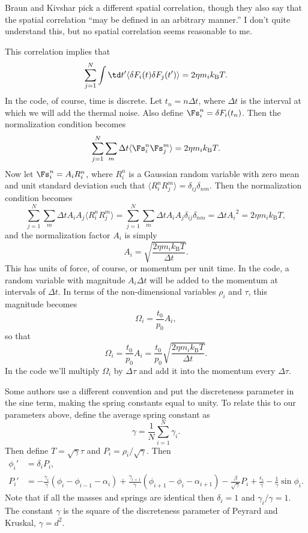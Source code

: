 \documentclass[11pt]{article}
\begin{document}
Braun and Kivshar pick a different spatial correlation, though they also say that the spatial correlation ``may be defined in an arbitrary manner.'' I don't quite understand this, but no spatial correlation seems reasonable to me.

This correlation implies that
\[
\sum_{j=1}^N\int \td t' \langle\delta F_i(t)\delta F_j(t')\rangle
	= 2\eta m_ik_\text{B}T.
\]
In the code, of course, time is discrete. Let $t_n=n\Delta t$, where $\Delta t$ is the interval at which we will add the thermal noise. Also define $\Fs_i^n=\delta F_i(t_n)$. Then the normalization condition becomes
\[
\sum_{j=1}^N\sum_m \Delta t\langle \Fs_i^n\Fs_j^{m}\rangle = 2\eta m_ik_\text{B}T.
\]
Now let $\Fs_i^n=A_iR_i^n$, where $R_i^n$ is a Gaussian random variable with zero mean and unit standard deviation such that $\langle R_i^nR_j^m\rangle=\delta_{ij}\delta_{nm}$. Then the normalization condition becomes
\[
\sum_{j=1}^N\sum_m \Delta t A_i A_j\langle R_i^nR_j^m\rangle
	=\sum_{j=1}^N\sum_m \Delta t A_i A_j\delta_{ij}\delta_{nm}
	=\Delta t{A_i}^2
	=2\eta m_ik_\text{B}T,
\]
and the normalization factor $A_i$ is simply
\[
A_i=\sqrt{\frac{2\eta m_ik_\text{B}T}{\Delta t}}.
\]
This has units of force, of course, or momentum per unit time. In the code, a random variable with magnitude $A_i\Delta t$ will be added to the momentum at intervals of $\Delta t$. In terms of the non-dimensional variables $\rho_i$ and $\tau$, this magnitude becomes
\[
\Omega_i=\frac{t_0}{p_0}A_i,
\]
so that
\[
\Omega_i=\frac{t_0}{p_0}A_i
	=\frac{t_0}{p_0}\sqrt{\frac{2\eta m_ik_\text{B}T}{\Delta t}}.
\]
In the code we'll multiply $\Omega_i$ by $\Delta\tau$ and add it into the momentum every $\Delta\tau$.

Some authors use a different convention and put the discreteness parameter in the sine term, making the spring constants equal to unity. To relate this to our parameters above, define the average spring constant as
\[
\gamma=\frac{1}{N}\sum_{i=1}^N \gamma_i.
\]
Then define $T=\sqrt{\gamma}\tau$ and $P_i=\rho_i/\sqrt{\gamma}$. Then
\begin{align*}
\phi_i'&=\delta_i P_i,\\
P_i'&=-\frac{\gamma_i}{\gamma}(\phi_i-\phi_{i-1}-\alpha_i)
	+\frac{\gamma_{i+1}}{\gamma}(\phi_{i+1}-\phi_i-\alpha_{i+1})
	-\frac{\beta}{\sqrt{\gamma}}P_i+\frac{\epsilon_i}{\gamma}
	-\frac{1}{\gamma}\sin\phi_i.
\end{align*}
Note that if all the masses and springs are identical then $\delta_i=1$ and $\gamma_i/\gamma=1$. The constant $\gamma$ is the square of the discreteness parameter of Peyrard and Kruskal, $\gamma=d^2$.
\end{document}
